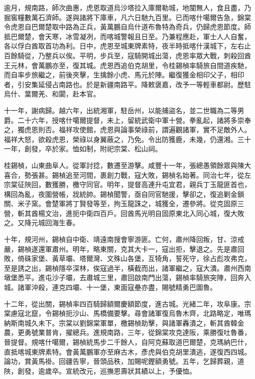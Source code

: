 \begin{pinyinscope}
逾月，規南路，師次曲惠，虎恩取道烏沙塔拉入庫爾勒城，地闃無人，食且盡，乃掘窖糧數萬石濟師。遂與諸將下庫車，凡六日馳九百里。已而喀什噶爾告急，錦棠令虎恩自巴爾楚取中路為正兵，黃萬鵬自烏什道布魯特為奇兵，仍歸虎恩節度。師抵巴爾楚，會天寒，冰雪凝冽，而喀城警報且日至。乃兼程應赴，軍士人人自奮，各以俘白酋取首功為利。日中，虎恩至城東牌素特，夜半時抵喀什漢城下，左右止百餘騎從，乃整兵以俟。平明，步兵至，寇騎開城出蕩，虎恩率眾大戰，刺殺回酋王元林，會萬鵬亦至，復其城。虎恩西追伯克胡里，令桂錫楨率騎旅自間道疾馳，而自率步旅繼之，前後夾擊，生擒餘小虎、馬元於陣。繼復獲金相印父子，相印者，引安集延侵占南路也。於是新疆南路平。降敕褒嘉，改予一等輕車都尉。歷駐烏什、葉爾羌、和闐，赴本官。

十一年，謝病歸。越六年，出統湘軍，駐岳州，以能捕盜名，並二世職為二等男爵。二十六年，授喀什噶爾提督，未上，留統武衛中軍十營。拳亂起，諸將多崇奉之，獨虎恩則否。福祥攻使館，虎恩與論事榮祿前，謂遍觀諸軍，實不足敵外人。福祥大怒，欲殺虎恩，榮祿以身翼蔽之，乃免。令出防獲鹿，未幾，仍還湘。三十一年，創發，卒於家。恤如制，附祀宗棠、松山祠。

桂錫楨，山東曲阜人。從軍討捻，數遷至游擊。咸豐十一年，張總愚領餘眾與陳大喜合，勢張甚。錫楨追至河間，裹創力戰，寇大敗，錫楨名始著。同治七年，從左宗棠征陜回，數獲勝，檄守同官。明年，提督高連升屯宜君，親兵丁玉龍匪首也，構回為亂，夜圍營帳，戕統帥。錫楨聞警，亟自同官馳援，擊卻之，復追剿金鎖關、米子窯。會楚軍將丁賢發等至，拘玉龍誅之，城獲全，遷參將。從克固原三營，斬其酋楊文治，進扼中衛四百戶。回酋馬光明自固原東北入同心城，復大敗之。又降元城回海生春。

十年，規河州，錫楨自中衛、靖遠南搜會寧游匪。亡何，肅州降回叛，甘、涼戒嚴，錫楨遂還軍肅州。明年，略東關，克其大卡一，寇出拒，擊退之。先是肅回敗，倚硃家堡、黃草壩、塔爾灣、文殊山各堡，互犄角，誓死守，徐占彪攻弗克，至是誘之出，錫楨隱卒深林，俟寇過半，橫截而出，諸軍繼之，寇大潰。肅州西南墩堡悉平。進屯沙子壩，去肅城三里，肅回啟南門出蕩，錫楨率騎旅突陣，回奔入城。諸軍沖殺，連克四壩、十一堡，東面寇壘亦盡，賜號精勇巴圖魯。

十二年，從出關，錫楨率四百騎歸額爾慶額節度，進古城。光緒二年，攻阜康。宗棠慮寇北竄，令錫楨扼沙山、馬橋備要擊。尋會諸軍復烏魯木齊，北路略定，唯瑪納斯南城久未下。宗棠以劉錦棠軍單，檄錫楨助擊，與諸軍轟潰之，斬其酋韓金農，更勇號業普肯，擢總兵。進規南路，三年，從錦棠攻克達阪，乘勝復吐魯番，晉提督。規喀什噶爾，錫楨統馬步二千餘人，自阿克蘇取道巴爾楚，克瑪納巴什，直抵喀城東牌素特。會黃萬鵬軍亦至麻古木，彥虎與伯克胡里潰逃，遂復西四城。論功，賞黃馬褂。回疆告寧，晉頭品秩，加賜呢鏗額勇號。五年，乞歸葬親，道陜，創發，逾歲卒。宣統改元，巡撫恩壽狀其績以上，予優恤。


\end{pinyinscope}
